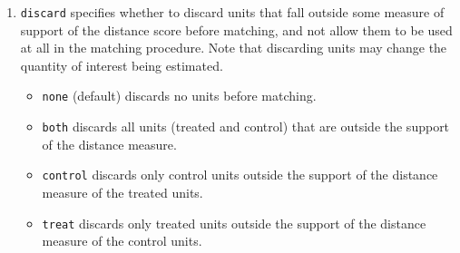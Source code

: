 \documentclass[oneside,letterpaper,titlepage]{article}
\begin{document}
\begin{enumerate}
\item \texttt{discard} specifies whether to discard units that fall
  outside some measure of support of the distance score before
  matching, and not allow them to be used at all in the matching
  procedure.  Note that discarding units may change the quantity of
  interest being estimated.
  \begin{itemize}
  \item \texttt{none} (default) discards no units before matching.
  \item \texttt{both} discards all units (treated and control) that
    are outside the support of the distance measure.
  \item \texttt{control} discards only control units outside the
    support of the distance measure of the treated units.
  \item \texttt{treat} discards only treated units outside the support
    of the distance measure of the control units.
  \end{itemize}
  

\end{enumerate}
\end{document}
